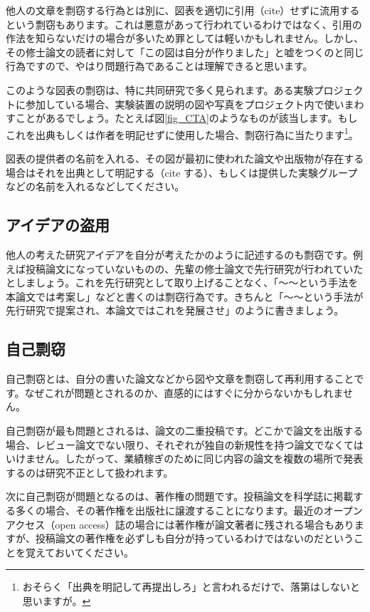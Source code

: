 他人の文章を剽窃する行為とは別に、図表を適切に引用（cite）せずに流用するという剽窃もあります。これは悪意があって行われているわけではなく、引用の作法を知らないだけの場合が多いため罪としては軽いかもしれません。しかし、その修士論文の読者に対して「この図は自分が作りました」と嘘をつくのと同じ行為ですので、やはり問題行為であることは理解できると思います。

このような図表の剽窃は、特に共同研究で多く見られます。ある実験プロジェクトに参加している場合、実験装置の説明の図や写真をプロジェクト内で使いまわすことがあるでしょう。たとえば図\ref{fig_CTA}のようなものが該当します。もしこれを出典もしくは作者を明記せずに使用した場合、剽窃行為に当たります\footnote{おそらく「出典を明記して再提出しろ」と言われるだけで、落第はしないと思いますが。}。

図表の提供者の名前を入れる、その図が最初に使われた論文や出版物が存在する場合はそれを出典として明記する（cite する）、もしくは提供した実験グループなどの名前を入れるなどしてください。

\subsection{アイデアの盗用}
他人の考えた研究アイデアを自分が考えたかのように記述するのも剽窃です。例えば投稿論文になっていないものの、先輩の修士論文で先行研究が行われていたとしましょう。これを先行研究として取り上げることなく、「〜〜という手法を本論文では考案し」などと書くのは剽窃行為です。きちんと「〜〜という手法が先行研究で提案され、本論文ではこれを発展させ」のように書きましょう。

\subsection{自己剽窃}

自己剽窃とは、自分の書いた論文などから図や文章を剽窃して再利用することです。なぜこれが問題とされるのか、直感的にはすぐに分からないかもしれません。

自己剽窃が最も問題とされるは、論文の二重投稿です。どこかで論文を出版する場合、レビュー論文でない限り、それぞれが独自の新規性を持つ論文でなくてはいけません。したがって、業績稼ぎのために同じ内容の論文を複数の場所で発表するのは研究不正として扱われます。

次に自己剽窃が問題となるのは、著作権の問題です。投稿論文を科学誌に掲載する多くの場合、その著作権を出版社に譲渡することになります。最近のオープンアクセス（open access）誌の場合には著作権が論文著者に残される場合もありますが、投稿論文の著作権を必ずしも自分が持っているわけではないのだということを覚えておいてください。

